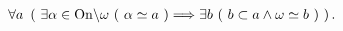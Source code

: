 	\begin{screen}
		\begin{dfn}[有限・可算・無限]
			
		\end{dfn}
	\end{screen}
	
	\begin{screen}
		\begin{thm}[任意の無限集合は可算集合を含む]
			\begin{align}
				\forall a\ \left(\ \exists \alpha \in \mathrm{On} \backslash {\bf \omega}\ (\  \alpha \simeq a\ )
				\Longrightarrow \exists b\ (\ b \subset a \wedge {\bf \omega} \simeq b\ )\ \right).
			\end{align}
		\end{thm}
	\end{screen}